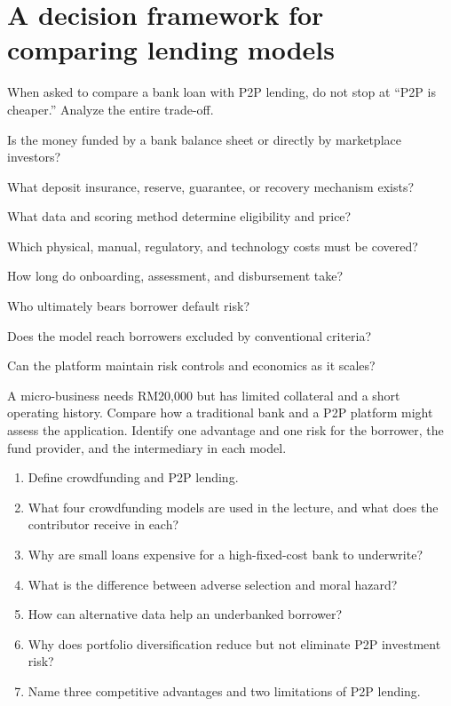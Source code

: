 \section{A decision framework for comparing lending models}

When asked to compare a bank loan with P2P lending, do not stop at ``P2P is cheaper.'' Analyze the entire trade-off.

\begin{utpsteps}
  \item {} Is the money funded by a bank balance sheet or directly by marketplace investors?
  \item {} What deposit insurance, reserve, guarantee, or recovery mechanism exists?
  \item {} What data and scoring method determine eligibility and price?
  \item {} Which physical, manual, regulatory, and technology costs must be covered?
  \item {} How long do onboarding, assessment, and disbursement take?
  \item {} Who ultimately bears borrower default risk?
  \item {} Does the model reach borrowers excluded by conventional criteria?
  \item {} Can the platform maintain risk controls and economics as it scales?
\end{utpsteps}

\begin{tryit}
A micro-business needs RM20,000 but has limited collateral and a short operating history. Compare how a traditional bank and a P2P platform might assess the application. Identify one advantage and one risk for the borrower, the fund provider, and the intermediary in each model.
\end{tryit}

\begin{quickcheck}
\begin{enumerate}
  \item Define crowdfunding and P2P lending.
  \item What four crowdfunding models are used in the lecture, and what does the contributor receive in each?
  \item Why are small loans expensive for a high-fixed-cost bank to underwrite?
  \item What is the difference between adverse selection and moral hazard?
  \item How can alternative data help an underbanked borrower?
  \item Why does portfolio diversification reduce but not eliminate P2P investment risk?
  \item Name three competitive advantages and two limitations of P2P lending.
\end{enumerate}
\end{quickcheck}
